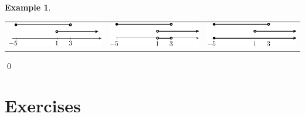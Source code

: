 \documentclass[11pt]{article}
\theoremstyle{definition}  %
\newtheorem{ex}{\bf Example}
\begin{document}
\begin{ex}
\begin{enumerate}
\begin{center}

\begin{tabular}{ccc}

\includegraphics{SetTheory-23}  &

\includegraphics{SetTheory-24}  &

\includegraphics{SetTheory-25} \\

\end{tabular}

\end{center}

\end{enumerate}

\vspace*{-.4in} \qed

\end{ex}

\newpage

\section{Exercises}
\end{document}
